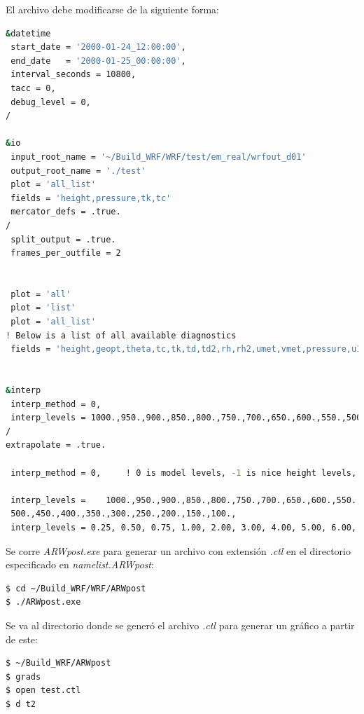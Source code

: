 \documentclass[12pt,letter]{article}
\begin{document}
\noindent El archivo debe modificarse de la siguiente forma:
\begin{lstlisting}[language=bash]
&datetime
 start_date = '2000-01-24_12:00:00',
 end_date   = '2000-01-25_00:00:00',
 interval_seconds = 10800,
 tacc = 0,
 debug_level = 0,
/

&io
 input_root_name = '~/Build_WRF/WRF/test/em_real/wrfout_d01'
 output_root_name = './test'
 plot = 'all_list'
 fields = 'height,pressure,tk,tc'
 mercator_defs = .true.
/
 split_output = .true.
 frames_per_outfile = 2


 plot = 'all'
 plot = 'list' 
 plot = 'all_list'
! Below is a list of all available diagnostics
 fields = 'height,geopt,theta,tc,tk,td,td2,rh,rh2,umet,vmet,pressure,u10m,v10m,wdir,wspd,wd10,ws10,slp,mcape,mcin,lcl,lfc,cape,cin,dbz,max_dbz,clfr'
 

&interp
 interp_method = 0,
 interp_levels = 1000.,950.,900.,850.,800.,750.,700.,650.,600.,550.,500.,450.,400.,350.,300.,250.,200.,150.,100.,
/
extrapolate = .true.

 interp_method = 0,     ! 0 is model levels, -1 is nice height levels, 1 is user specified pressure/height

 interp_levels =    1000.,950.,900.,850.,800.,750.,700.,650.,600.,550.,
 500.,450.,400.,350.,300.,250.,200.,150.,100.,
 interp_levels = 0.25, 0.50, 0.75, 1.00, 2.00, 3.00, 4.00, 5.00, 6.00, 7.00, 8.00, 9.00, 10.0, 11.0, 12.0, 13.0, 14.0, 15.0, 16.0, 17.0, 18.0, 19.0, 20.0,

\end{lstlisting}

\noindent Se corre \textit{ARWpost.exe} para generar un archivo con extensi\'on \textit{.ctl} en el directorio especificado en \textit{namelist.ARWpost}:
\begin{lstlisting}[language=bash]
$ cd ~/Build_WRF/WRF/ARWpost
$ ./ARWpost.exe
\end{lstlisting}

\noindent Se va al directorio donde se gener\'o el archivo \textit{.ctl} para generar un gr\'afico a partir de este:
\begin{lstlisting}[language=bash]
$ ~/Build_WRF/ARWpost
$ grads
$ open test.ctl
$ d t2
\end{lstlisting}
\end{document}
